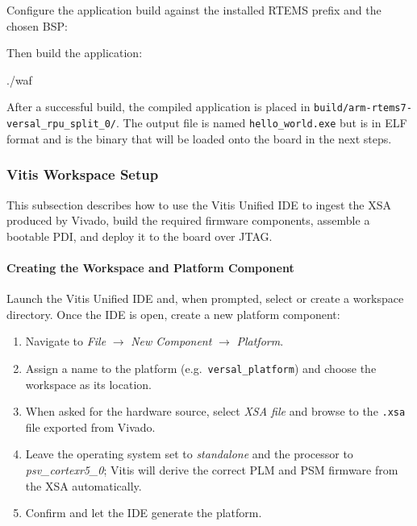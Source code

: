 \documentclass[
	a4paper,
]{CSMakotoTechnicalReport}
\begin{document}
Configure the application build against the installed RTEMS prefix and the chosen BSP:


Then build the application:

\begin{bashcode}
./waf
\end{bashcode}

After a successful build, the compiled application is placed in \texttt{build/arm-rtems7-versal\_rpu\_split\_0/}.
The output file is named \texttt{hello\_world.exe} but is in ELF format and is the binary that will be loaded onto the board in the next steps.

\subsubsection{Vitis Workspace Setup}
\label{sec:guide-vitis-base}

This subsection describes how to use the Vitis Unified IDE to ingest the XSA produced by Vivado, build the required firmware components, assemble a bootable PDI, and deploy it to the board over JTAG.

\paragraph*{Creating the Workspace and Platform Component}

Launch the Vitis Unified IDE and, when prompted, select or create a workspace directory.
Once the IDE is open, create a new platform component:

\begin{enumerate}
    \item Navigate to \textit{File} $\to$ \textit{New Component} $\to$ \textit{Platform}.
    \item Assign a name to the platform (e.g.\ \texttt{versal\_platform}) and choose the workspace as its location.
    \item When asked for the hardware source, select \textit{XSA file} and browse to the \texttt{.xsa} file exported from Vivado.
    \item Leave the operating system set to \textit{standalone} and the processor to \textit{psv\_cortexr5\_0}; Vitis will derive the correct PLM and PSM firmware from the XSA automatically.
    \item Confirm and let the IDE generate the platform.
\end{enumerate}
\end{document}
